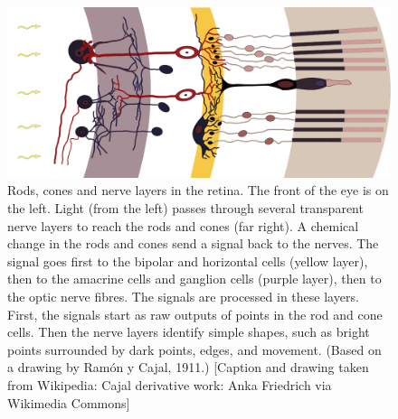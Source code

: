 \documentclass[11pt,a4paper]{scrartcl}
\begin{document}
\begin{figure}
 \begin{center}
\includegraphics[width=12cm]{retina.png}
\end{center}
\caption{Rods, cones and nerve layers in the retina. The front of the
  eye is on the left. Light (from the left) passes through several
  transparent nerve layers to reach the rods and cones (far right). A
  chemical change in the rods and cones send a signal back to the
  nerves. The signal goes first to the bipolar and horizontal cells
  (yellow layer), then to the amacrine cells and ganglion cells
  (purple layer), then to the optic nerve fibres. The signals are
  processed in these layers. First, the signals start as raw outputs
  of points in the rod and cone cells. Then the nerve layers identify
  simple shapes, such as bright points surrounded by dark points,
  edges, and movement. (Based on a drawing by Ramón y Cajal, 1911.)
  [Caption and drawing taken from Wikipedia: Cajal derivative work:
    Anka Friedrich via Wikimedia Commons]\label{fig:retina}}
\end{figure}
\end{document}
